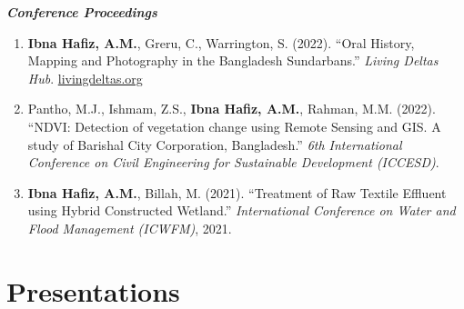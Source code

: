\documentclass[a4paper,11pt]{article}
\begin{document}
\textbf{\textit{Conference Proceedings}}
\vspace{1mm}
\small{
\begin{enumerate}[leftmargin=*, labelsep=0.5em, itemsep=1.5mm]

\item \textbf{Ibna Hafiz, A.M.}, Greru, C., Warrington, S. (2022). ``Oral History, Mapping and Photography in the Bangladesh Sundarbans.'' \textit{Living Deltas Hub}. \href{https://livingdeltas.org/blog/oral-history-mapping-and-photography-in-the-bangladesh-sundarbans}{livingdeltas.org}

\item Pantho, M.J., Ishmam, Z.S., \textbf{Ibna Hafiz, A.M.}, Rahman, M.M. (2022). ``NDVI: Detection of vegetation change using Remote Sensing and GIS. A study of Barishal City Corporation, Bangladesh.'' \textit{6th International Conference on Civil Engineering for Sustainable Development (ICCESD)}.

\item \textbf{Ibna Hafiz, A.M.}, Billah, M. (2021). ``Treatment of Raw Textile Effluent using Hybrid Constructed Wetland.'' \textit{International Conference on Water and Flood Management (ICWFM)}, 2021.

\end{enumerate}
}
\vspace{-2mm}

\section{\textbf{Presentations}}
\vspace{1mm}
\end{document}
